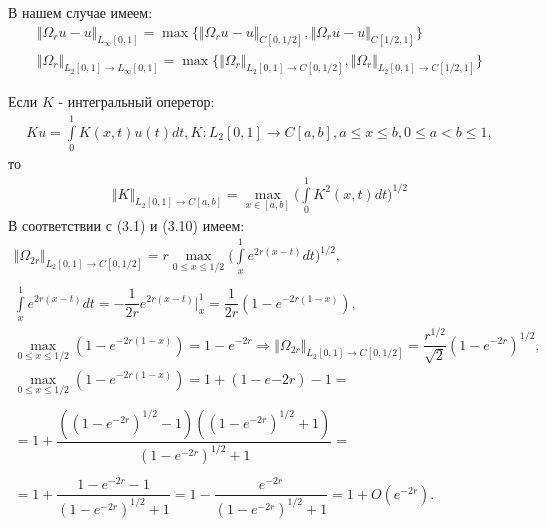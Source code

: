 В нашем случае имеем:
\begin{equation}
\begin{array}{c}

\Vert \Omega_r u - u \Vert_{L_\infty[0,1]} = \max{\lbrace\Vert \Omega_r u - u \Vert_{C[0,1/2]},\Vert \Omega_r u - u \Vert_{C[1/2,1]}\rbrace} \\
\Vert \Omega_r \Vert_{L_2[0,1] \rightarrow L_\infty[0,1]} = \max{\lbrace \Vert \Omega_r \Vert_{L_2[0,1] \rightarrow C[0,1/2]} , \Vert \Omega_r \Vert_{L_2[0,1] \rightarrow C[1/2,1]} \rbrace}

\end{array}
\end{equation}

Если $ K $ - интегральный оперетор:
\begin{equation}
\begin{array}{c}
\nonumber

Ku = \int\limits_0^1 K(x,t)u(t)dt, K:L_2[0,1] \rightarrow C[a,b], a \leq x \leq b, 0 \leq a < b \leq 1,

\end{array}
\end{equation}
то
\begin{equation}
\begin{array}{c}

\Vert K \Vert_{L_2[0,1] \rightarrow C[a,b]} = \max\limits_{x \in [a,b]}\biggl(\int\limits_0^1 K^2(x,t)dt\biggr)^{1/2}

\end{array}
\end{equation}
В соответствии с (3.1) и (3.10) имеем:
\begin{equation}
\begin{array}{c}
\nonumber

\Vert \Omega_{2r} \Vert_{L_2[0,1] \rightarrow C[0,1/2]} = r \max\limits_{0 \leq x \leq 1/2} \biggl(\int\limits_x^1 e^{2r(x-t)}dt\biggr)^{1/2}, \\\\
\int\limits_x^1 e^{2r(x-t)}dt = -\dfrac{1}{2r}e^{2r(x-t)}\biggl|_x^1 = \dfrac{1}{2r}(1-e^{-2r(1-x)}), \\
\max\limits_{0 \leq x \leq 1/2}(1-e^{-2r(1-x)}) = 1 - e^{-2r} \Rightarrow \Vert \Omega_{2r} \Vert_{L_2[0,1] \rightarrow C[0,1/2]} = \dfrac{r^{1/2}}{\sqrt{2}}( 1 - e^{-2r})^{1/2}, \\
\max\limits_{0\leq x \leq 1/2}(1-e^{-2r(1-x)}) = 1 + (1-e{-2r}) - 1 = \\\\ = 1 + \dfrac{((1-e^{-2r})^{1/2}-1)((1-e^{-2r})^{1/2}+1)}{(1-e^{-2r})^{1/2}+1} = \\\\ = 1 + \dfrac{1-e^{-2r}-1}{(1-e^{-2r})^{1/2}+1} = 1 - \dfrac{e^{-2r}}{(1-e^{-2r})^{1/2}+1} = 1 + O(e^{-2r}).

\end{array}
\end{equation}
